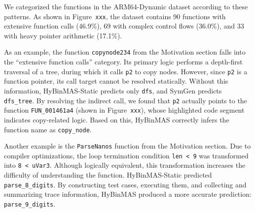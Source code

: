 \documentclass[acmsmall,screen,review,anonymous]{acmart} %
\begin{document}
We categorized the functions in the ARM64-Dynamic dataset according to these patterns. As shown in Figure~\texttt{xxx}, the dataset contains 90 functions with extensive function calls (46.9\%), 69 with complex control flows (36.0\%), and 33 with heavy pointer arithmetic (17.1\%).

As an example, the function \texttt{copynode234} from the Motivation section falls into the “extensive function calls” category. Its primary logic performs a depth-first traversal of a tree, during which it calls \texttt{p2} to copy nodes. However, since \texttt{p2} is a function pointer, its call target cannot be resolved statically. Without this information, HyBinMAS-Static predicts only \texttt{dfs}, and SymGen predicts \texttt{dfs\_tree}. By resolving the indirect call, we found that \texttt{p2} actually points to the function \texttt{FUN\_001461a4} (shown in Figure~\texttt{xxx}), whose highlighted code segment indicates copy-related logic. Based on this, HyBinMAS correctly infers the function name as \texttt{copy\_node}.

Another example is the \texttt{ParseNanos} function from the Motivation section. Due to compiler optimizations, the loop termination condition \texttt{len < 9} was transformed into \texttt{8 < uVar3}. Although logically equivalent, this transformation increases the difficulty of understanding the function. HyBinMAS-Static predicted \texttt{parse\_8\_digits}. By constructing test cases, executing them, and collecting and summarizing trace information, HyBinMAS produced a more accurate prediction: \texttt{parse\_9\_digits}.



\end{document}
